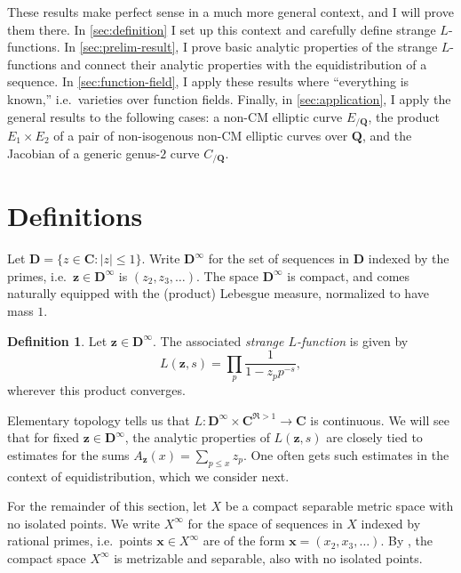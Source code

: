 \documentclass{article}
\newcommand{\bC}{\mathbf{C}}
\newcommand{\bD}{\mathbf{D}}
\newcommand{\bQ}{\mathbf{Q}}
\newcommand{\bx}{{\boldsymbol x}}
\newcommand{\bz}{{\boldsymbol z}}
\theoremstyle{definition}
\newtheorem{definition}[subsection]{Definition}
\begin{document}
These results make perfect sense in a much more general context, and I will 
prove them there. In \autoref{sec:definition} I set up this context and 
carefully define strange $L$-functions. In \autoref{sec:prelim-result}, I 
prove basic analytic properties of the strange $L$-functions and 
connect their analytic properties with the equidistribution of a sequence. 
In \autoref{sec:function-field}, I apply these results where ``everything is 
known,'' i.e.~varieties over function fields.
Finally, in \autoref{sec:application}, I apply the general results to the 
following cases: a non-CM elliptic curve $E_{/\bQ}$, the product 
$E_1\times E_2$ of a pair of non-isogenous non-CM elliptic curves over $\bQ$, 
and the Jacobian of a generic genus-$2$ curve $C_{/\bQ}$. 





\section{Definitions}\label{sec:definition}

Let $\bD=\{z\in \bC : |z|\leqslant 1\}$. Write $\bD^\infty$ for the set of 
sequences in $\bD$ indexed by the primes, i.e.~$\bz\in\bD^\infty$ is 
$(z_2,z_3,\dots)$. The space $\bD^\infty$ is compact, and comes naturally 
equipped with the (product) Lebesgue measure, normalized to have mass $1$. 

\begin{definition}
Let $\bz\in\bD^\infty$. The associated \emph{strange $L$-function} is given by 
\[
	L(\bz,s) = \prod_p \frac{1}{1-z_p p^{-s}} ,
\]
wherever this product converges. 
\end{definition}

Elementary topology tells us that $L\colon \bD^\infty\times \bC^{\Re>1}\to \bC$ 
is continuous. 
We will see that for fixed $\bz\in \bD^\infty$, the analytic properties of 
$L(\bz,s)$ are closely tied to 
estimates for the sums $A_\bz(x) = \sum_{p\leqslant x} z_p$. One 
often gets such estimates in the context of equidistribution, which we consider 
next.

For the remainder of this section, let $X$ be a compact separable metric space with no 
isolated points. We write $X^\infty$ for the space of sequences in $X$ indexed 
by rational primes, i.e.~points $\bx\in X^\infty$ are of the form 
$\bx=(x_2,x_3,\dots)$. By \cite[Cor.2.3.16, Th.4.2.2]{engelking-1989}, the 
compact space $X^\infty$ is metrizable and separable, also with no isolated 
points. 
\end{document}
